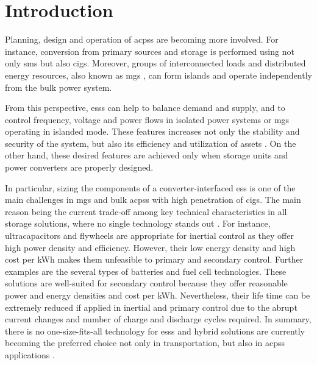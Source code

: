 \documentclass[utf8]{frontiersSCNS} %
\begin{document}
\section{Introduction}

Planning, design and operation of \glspl{acps} are becoming more involved. For instance, conversion from primary sources and storage is performed using not only \glspl{sm} but also \glspl{cig}. Moreover, groups of interconnected loads and distributed energy resources, also known as \glspl{mg} \citep{IEEEStd154720182018,IEEEStd20302018}, can form islands and operate independently from the bulk power system.

From this perspective, \glspl{ess} can help to balance demand and supply, and to control frequency, voltage and power flows in isolated power systems or \glspl{mg} operating in islanded mode. These features increases not only the stability and security of the system, but also its efficiency and utilization of assets \citep{fuRoleEnergyStorage2013, strbacMicrogridsEnhancingResilience2015}. On the other hand, these desired features are achieved only when storage units and power converters are properly designed.

In particular, sizing the components of a converter-interfaced \gls{ess} is one of the main challenges in \glspl{mg} and bulk \glspl{acps} with high penetration of \glspl{cig}. The main reason being the current trade-off among key technical characteristics in all storage solutions, where no single technology stands out \citep{koohi-kamaliEmergenceEnergyStorage2013, galloEnergyStorageEnergy2016, farhadiEnergyStorageTechnologies2016}. For instance, ultracapacitors and flywheels are appropriate for inertial control as they offer high power density and efficiency. However, their low energy density and high cost per kWh makes them unfeasible to primary and secondary control. Further examples are the several types of batteries and fuel cell technologies. These solutions are well-suited for secondary control because they offer reasonable power and energy densities and cost per kWh. Nevertheless, their life time can be extremely reduced if applied in inertial and primary control due to the abrupt current changes and number of charge and discharge cycles required. In summary, there is no one-size-fits-all technology for \glspl{ess} and hybrid solutions are currently becoming the preferred choice not only in transportation, but also in \glspl{acps} applications \citep{hemmatiEmergenceHybridEnergy2016}.
\end{document}
